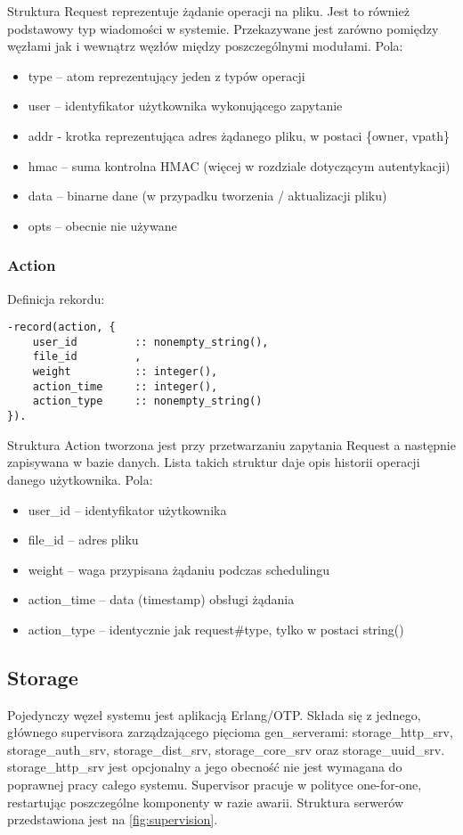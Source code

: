 Struktura Request reprezentuje żądanie operacji na pliku. Jest to również podstawowy typ wiadomości w systemie. Przekazywane jest zarówno pomiędzy węzłami jak i wewnątrz węzłów między poszczególnymi modułami. Pola:
\begin{itemize}
	\item type – atom reprezentujący jeden z typów operacji
	\item user – identyfikator użytkownika wykonującego zapytanie
	\item addr - krotka reprezentująca adres żądanego pliku, w postaci \{owner, vpath\}
	\item hmac – suma kontrolna HMAC (więcej w rozdziale dotyczącym autentykacji)
	\item data – binarne dane (w przypadku tworzenia / aktualizacji pliku)
	\item opts – obecnie nie używane
\end{itemize}

\subsubsection{Action}
Definicja rekordu:
\begin{lstlisting}
-record(action, {
	user_id 		:: nonempty_string(), 
	file_id 		, 
	weight 			:: integer(), 
	action_time 	:: integer(), 
	action_type 	:: nonempty_string() 
}).
\end{lstlisting}

Struktura Action tworzona jest przy przetwarzaniu zapytania Request a następnie zapisywana w bazie danych. Lista takich struktur daje opis historii operacji danego użytkownika. Pola:
\begin{itemize}
	\item user\_id – identyfikator użytkownika
	\item file\_id – adres pliku
	\item weight – waga przypisana żądaniu podczas schedulingu
	\item action\_time – data (timestamp) obsługi żądania
	\item action\_type – identycznie jak request\#type, tylko w postaci string()
\end{itemize}





\subsection{Storage}
Pojedynczy węzeł systemu jest aplikacją Erlang/OTP. Składa się z jednego, głównego supervisora zarządzającego pięcioma gen\_serverami: storage\_http\_srv, storage\_auth\_srv, storage\_dist\_srv, storage\_core\_srv oraz storage\_uuid\_srv. storage\_http\_srv jest opcjonalny a jego obecność nie jest wymagana do poprawnej pracy całego systemu. Supervisor pracuje w polityce one-for-one, restartując poszczególne komponenty w razie awarii. Struktura serwerów przedstawiona jest na \autoref{fig:supervision}.

